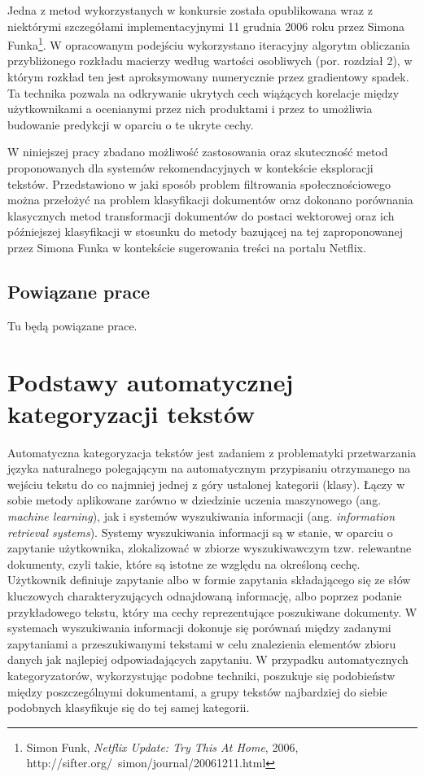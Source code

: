 \documentclass{pracamgr}
\begin{document}
Jedna z metod wykorzystanych w konkursie została opublikowana wraz z niektórymi szczegółami implementacyjnymi 11 grudnia 2006 roku przez Simona Funka\footnote{Simon Funk, \textit{Netflix Update: Try This At Home}, 2006, http://sifter.org/~simon/journal/20061211.html}. W opracowanym podejściu wykorzystano iteracyjny algorytm obliczania przybliżonego rozkładu macierzy według wartości osobliwych (por. rozdział 2), w którym rozkład ten jest aproksymowany numerycznie przez gradientowy spadek. Ta technika pozwala na odkrywanie ukrytych cech wiążących korelacje między użytkownikami a ocenianymi przez nich produktami i przez to umożliwia budowanie predykcji w oparciu o te ukryte cechy.

W niniejszej pracy zbadano możliwość zastosowania oraz skuteczność metod proponowanych dla systemów rekomendacyjnych w kontekście eksploracji tekstów. Przedstawiono w jaki sposób problem filtrowania społecznościowego można przełożyć na problem klasyfikacji dokumentów oraz dokonano porównania klasycznych metod transformacji dokumentów do postaci wektorowej oraz ich późniejszej klasyfikacji w stosunku do metody bazującej na tej zaproponowanej przez Simona Funka w kontekście sugerowania treści na portalu Netflix. 

\section*{Powiązane prace}

Tu będą powiązane prace.

\chapter{Podstawy automatycznej kategoryzacji tekstów}

Automatyczna kategoryzacja tekstów jest zadaniem z problematyki przetwarzania języka naturalnego polegającym na automatycznym przypisaniu otrzymanego na wejściu tekstu do co najmniej jednej z góry ustalonej kategorii (klasy). Łączy w sobie metody aplikowane zarówno w dziedzinie uczenia maszynowego (ang. \textit{machine learning}), jak i systemów wyszukiwania informacji (ang. \textit{information retrieval systems}). Systemy wyszukiwania informacji są w stanie, w oparciu o zapytanie użytkownika, zlokalizować w zbiorze wyszukiwawczym tzw. relewantne dokumenty, czyli takie, które są istotne ze względu na określoną cechę. Użytkownik definiuje zapytanie albo w formie zapytania składającego się ze słów kluczowych charakteryzujących odnajdowaną informację, albo poprzez podanie przykładowego tekstu, który ma cechy reprezentujące poszukiwane dokumenty. W systemach wyszukiwania informacji dokonuje się porównań między zadanymi zapytaniami a przeszukiwanymi tekstami w celu znalezienia elementów zbioru danych jak najlepiej odpowiadających zapytaniu. W przypadku automatycznych kategoryzatorów, wykorzystując podobne techniki, poszukuje się podobieństw między poszczególnymi dokumentami, a grupy tekstów najbardziej do siebie podobnych klasyfikuje się do tej samej kategorii.
\end{document}
